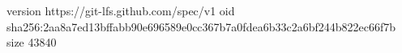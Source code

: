 version https://git-lfs.github.com/spec/v1
oid sha256:2aa8a7ed13bffabb90e696589e0cc367b7a0fdea6b33c2a6bf244b822ec66f7b
size 43840
